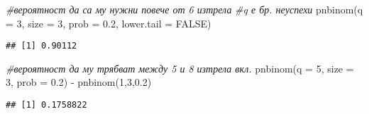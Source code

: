 \documentclass[
]{article}
\newenvironment{Shaded}{\begin{snugshade}}{\end{snugshade}}
\newcommand{\AttributeTok}[1]{\textcolor[rgb]{0.77,0.63,0.00}{#1}}
\newcommand{\CommentTok}[1]{\textcolor[rgb]{0.56,0.35,0.01}{\textit{#1}}}
\newcommand{\ConstantTok}[1]{\textcolor[rgb]{0.00,0.00,0.00}{#1}}
\newcommand{\DecValTok}[1]{\textcolor[rgb]{0.00,0.00,0.81}{#1}}
\newcommand{\FloatTok}[1]{\textcolor[rgb]{0.00,0.00,0.81}{#1}}
\newcommand{\FunctionTok}[1]{\textcolor[rgb]{0.00,0.00,0.00}{#1}}
\newcommand{\NormalTok}[1]{#1}
\newcommand{\SpecialCharTok}[1]{\textcolor[rgb]{0.00,0.00,0.00}{#1}}
\begin{document}
\begin{Shaded}
\begin{Highlighting}[]
\CommentTok{\#вероятност да са му нужни повече от 6 изтрела}
\CommentTok{\#q е бр. неуспехи}
\FunctionTok{pnbinom}\NormalTok{(}\AttributeTok{q =} \DecValTok{3}\NormalTok{, }\AttributeTok{size =} \DecValTok{3}\NormalTok{, }\AttributeTok{prob =} \FloatTok{0.2}\NormalTok{, }\AttributeTok{lower.tail =} \ConstantTok{FALSE}\NormalTok{)}
\end{Highlighting}
\end{Shaded}

\begin{verbatim}
## [1] 0.90112
\end{verbatim}

\begin{Shaded}
\begin{Highlighting}[]
\CommentTok{\#вероятност да му трябват между 5 и 8 изтрела вкл.}
\FunctionTok{pnbinom}\NormalTok{(}\AttributeTok{q =} \DecValTok{5}\NormalTok{, }\AttributeTok{size =} \DecValTok{3}\NormalTok{, }\AttributeTok{prob =} \FloatTok{0.2}\NormalTok{) }\SpecialCharTok{{-}} \FunctionTok{pnbinom}\NormalTok{(}\DecValTok{1}\NormalTok{,}\DecValTok{3}\NormalTok{,}\FloatTok{0.2}\NormalTok{)}
\end{Highlighting}
\end{Shaded}

\begin{verbatim}
## [1] 0.1758822
\end{verbatim}
\end{document}
